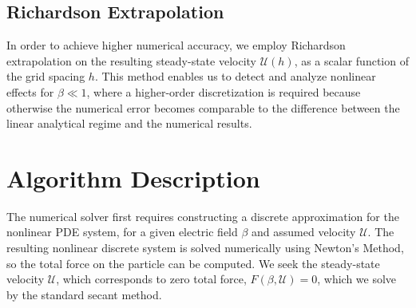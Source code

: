 \documentclass[MSc,beforeExam]{iitcsthesis}
\newcommand\cU{\mathscr{U}}
\begin{document}
\subsection{Richardson Extrapolation}
In order to achieve higher numerical accuracy, we employ Richardson extrapolation \cite{sidi2003practical}
on the resulting steady-state velocity $\cU(h)$, as a scalar function of the grid spacing $h$.
This method enables us to detect and analyze nonlinear effects for $\beta \ll 1$, where 
a higher-order discretization is required because otherwise
the numerical error becomes comparable to the difference between the linear analytical regime 
and the numerical results.

\section{Algorithm Description} \label{sec:algorithm}
The numerical solver first requires constructing a discrete 
approximation for the nonlinear PDE system,
for a given electric field $\beta$ and assumed velocity $\cU$. 
The resulting nonlinear discrete system is
solved numerically using Newton's Method, so the total force on the
particle can be computed. 
We seek the steady-state velocity $\cU$, 
which corresponds to zero total force, $F(\beta, \cU) = 0$,
which we solve by the standard secant method.
\end{document}
